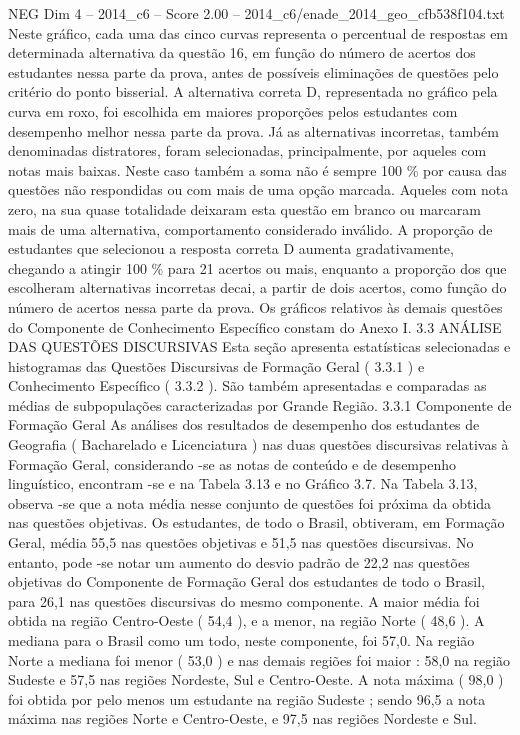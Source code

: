 \begin{textsample}{NEG Dim 4 – 2014\_c6 – Score 2.00 – 2014\_c6/enade\_2014\_geo\_cfb538f104.txt}
Neste gráfico, cada uma das cinco curvas representa o percentual de respostas em determinada alternativa da questão 16, em função do número de acertos dos estudantes nessa parte da prova, antes de possíveis eliminações de questões pelo critério do ponto bisserial.
A alternativa correta D, representada no gráfico pela curva em roxo, foi escolhida em maiores proporções pelos estudantes com desempenho melhor nessa parte da prova.
Já as alternativas incorretas, também denominadas distratores, foram selecionadas, principalmente, por aqueles com notas mais baixas.
Neste caso também a soma não é sempre 100 \% por causa das questões não respondidas ou com mais de uma opção marcada.
Aqueles com nota zero, na sua quase totalidade deixaram esta questão em branco ou marcaram mais de uma alternativa, comportamento considerado inválido.
A proporção de estudantes que selecionou a resposta correta D aumenta gradativamente, chegando a atingir 100 \% para 21 acertos ou mais, enquanto a proporção dos que escolheram alternativas incorretas decai, a partir de dois acertos, como função do número de acertos nessa parte da prova.
Os gráficos relativos às demais questões do Componente de Conhecimento Específico constam do Anexo I. 3.3 ANÁLISE DAS QUESTÕES DISCURSIVAS Esta seção apresenta estatísticas selecionadas e histogramas das Questões Discursivas de Formação Geral ( 3.3.1 ) e Conhecimento Específico ( 3.3.2 ).
São também apresentadas e comparadas as médias de subpopulações caracterizadas por Grande Região. 3.3.1 Componente de Formação Geral As análises dos resultados de desempenho dos estudantes de Geografia ( Bacharelado e Licenciatura ) nas duas questões discursivas relativas à Formação Geral, considerando -se as notas de conteúdo e de desempenho linguístico, encontram -se e na Tabela 3.13 e no Gráfico 3.7.
Na Tabela 3.13, observa -se que a nota média nesse conjunto de questões foi próxima da obtida nas questões objetivas.
Os estudantes, de todo o Brasil, obtiveram, em Formação Geral, média 55,5 nas questões objetivas e 51,5 nas questões discursivas.
No entanto, pode -se notar um aumento do desvio padrão de 22,2 nas questões objetivas do Componente de Formação Geral dos estudantes de todo o Brasil, para 26,1 nas questões discursivas do mesmo componente.
A maior média foi obtida na região Centro-Oeste ( 54,4 ), e a menor, na região Norte ( 48,6 ).
A mediana para o Brasil como um todo, neste componente, foi 57,0.
Na região Norte a mediana foi menor ( 53,0 ) e nas demais regiões foi maior : 58,0 na região Sudeste e 57,5 nas regiões Nordeste, Sul e Centro-Oeste.
A nota máxima ( 98,0 ) foi obtida por pelo menos um estudante na região Sudeste ; sendo 96,5 a nota máxima nas regiões Norte e Centro-Oeste, e 97,5 nas regiões Nordeste e Sul.

\end{textsample}
